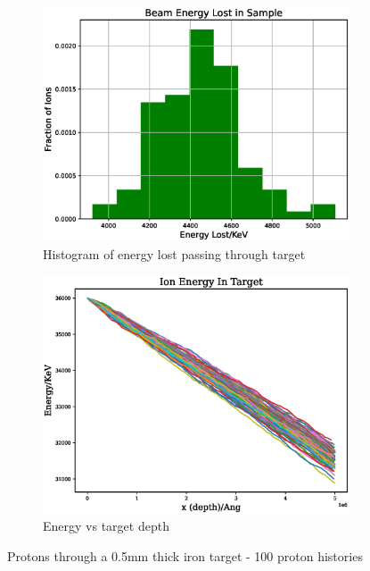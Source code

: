 \begin{figure}[htb]
\begin{subfigure}{0.49\textwidth}
  \includegraphics[width=\linewidth]{chapters/activity_code/images/energy_lost_500um.eps}
  \caption{Histogram of energy lost passing through target}
  \label{fig:energylost1}
\end{subfigure}
\begin{subfigure}{0.49\textwidth}
  \includegraphics[width=\linewidth]{chapters/activity_code/images/energy_depth_500um.eps}
  \caption{Energy vs target depth}
  \label{fig:fe36mevenergydepth}
\end{subfigure}
\caption{Protons through a 0.5mm thick iron target - 100 proton histories}
\label{fig:xsdata-particle1}
\end{figure}


